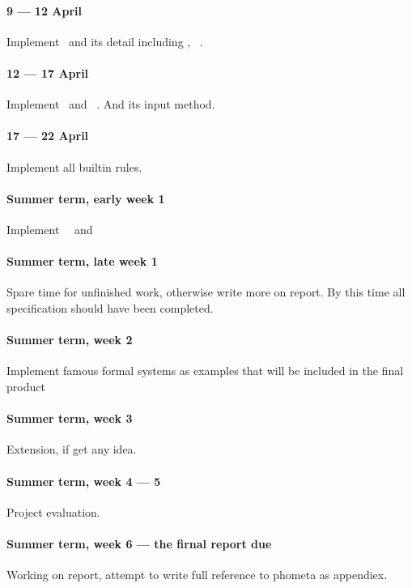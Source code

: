 \documentclass[master.tex]{subfiles}
\begin{document}
\paragraph{9 --- 12 April} Implement \kDefinition\ and its detail including \kMatch, \kLet\ \kBe.

\paragraph{12 --- 17 April} Implement \kSequence\ and \kLiteral\ \kGrammar. And its input method.

\paragraph{17 --- 22 April} Implement all builtin rules.

\paragraph{Summer term, early week 1} Implement \kCompound\ \kRule\ and \kAlias\

\paragraph{Summer term, late week 1} Spare time for unfinished work, otherwise write more on report. By this time all specification should have been completed.

\paragraph{Summer term, week 2} Implement famous formal systems as examples that will be included in the final product

\paragraph{Summer term, week 3} Extension, if get any idea.

\paragraph{Summer term, week 4 --- 5} Project evaluation.

\paragraph{Summer term, week 6 --- the firnal report due} Working on report, attempt to write full reference to phometa as appendiex.
\end{document}
